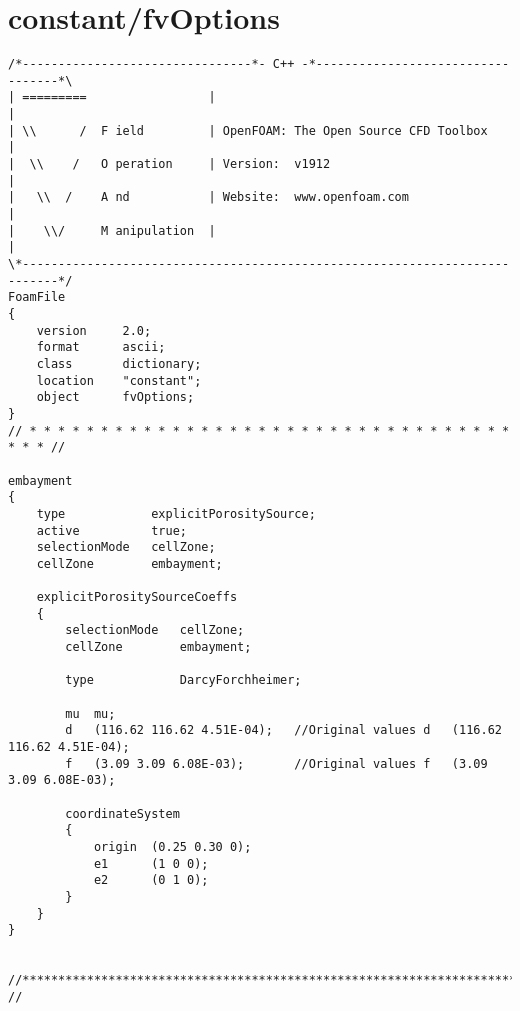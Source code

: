 \section{constant/fvOptions}
\begin{lstlisting}
/*--------------------------------*- C++ -*----------------------------------*\
| =========                 |                                                 |
| \\      /  F ield         | OpenFOAM: The Open Source CFD Toolbox           |
|  \\    /   O peration     | Version:  v1912                                 |
|   \\  /    A nd           | Website:  www.openfoam.com                      |
|    \\/     M anipulation  |                                                 |
\*---------------------------------------------------------------------------*/
FoamFile
{
    version     2.0;
    format      ascii;
    class       dictionary;
    location    "constant";
    object      fvOptions;
}
// * * * * * * * * * * * * * * * * * * * * * * * * * * * * * * * * * * * * * //

embayment
{
    type            explicitPorositySource;
    active			true;
	selectionMode   cellZone;
	cellZone        embayment;

    explicitPorositySourceCoeffs
    {
        selectionMode   cellZone;
        cellZone        embayment;

        type            DarcyForchheimer;
		
		mu	mu;
        d   (116.62 116.62 4.51E-04);	//Original values d   (116.62 116.62 4.51E-04);
        f   (3.09 3.09 6.08E-03);		//Original values f   (3.09 3.09 6.08E-03);

        coordinateSystem
        {
            origin  (0.25 0.30 0);
            e1      (1 0 0);
            e2      (0 1 0);
        }
    }
}


//************************************************************************* //

\end{lstlisting}

